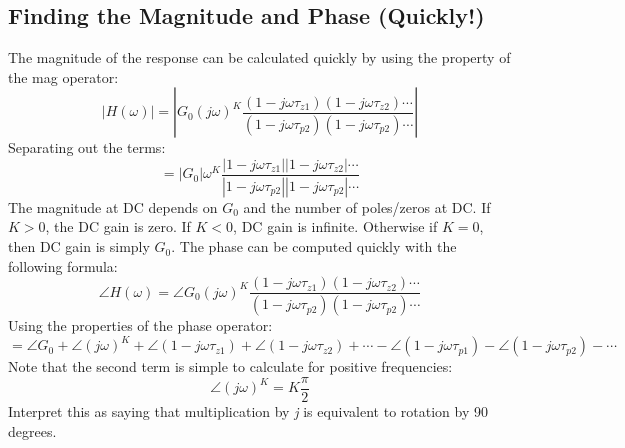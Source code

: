 \subsection{Finding the Magnitude and Phase (Quickly!)}
The magnitude of the response can be calculated quickly by using the property of the mag operator:
    \begin{equation}
        \left| {H(\omega )} \right| =
            \left| {{G_0}{{(j\omega )}^K} \frac{{(1 - j\omega {\tau _{z1}})(1 - j\omega {\tau _{z2}}) \cdots }}{{(1 - j\omega {\tau _{p2}})(1 - j\omega {\tau _{p2}}) \cdots }}} \right|
    \end{equation}
Separating out the terms:
    \begin{equation}
        = \left| {{G_0}} \right|{\omega ^K} \frac{{\left| {1 - j\omega {\tau _{z1}}} \right|\left| {1 - j\omega {\tau _{z2}}} \right| \cdots }} {{\left| {1 - j\omega {\tau _{p2}}} \right|\left| {1 - j\omega {\tau _{p2}}} \right| \cdots}}
    \end{equation}
The magnitude at DC depends on $G_0$  and the number of poles/zeros at DC. If $K > 0$,  the DC gain is zero. If $K < 0$, DC gain is infinite. Otherwise if $K = 0$, then DC gain is simply $G_0$.
The phase can be computed quickly with the following formula:
    \begin{equation}
        \angle H(\omega ) = \angle {G_0}{(j\omega )^K}\frac{{(1 - j\omega {\tau _{z1}})(1 - j\omega {\tau _{z2}}) \cdots }}{{(1 - j\omega {\tau _{p2}})(1 - j\omega {\tau _{p2}}) \cdots }}
    \end{equation}
Using the properties of the phase operator:
    \begin{equation}
        = \angle {G_0} + \angle {(j\omega )^K} + \angle (1 - j\omega {\tau _{z1}}) + \angle (1 - j\omega {\tau _{z2}}) + \cdots - \angle (1 - j\omega {\tau _{p1}}) - \angle (1 - j\omega {\tau _{p2}}) - \cdots
    \end{equation}
Note that the second term is simple to calculate for positive frequencies:
    \begin{equation}
        \angle {(j\omega )^K} = K\frac{\pi}{2}
    \end{equation}
Interpret this as saying that multiplication by \textit{j} is equivalent to rotation by 90 degrees.
